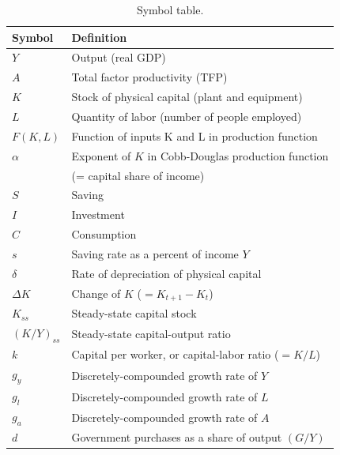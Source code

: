 \begin{table}[H]
\centering
\caption{Symbol table.}
\begin{tabular*}{0.95\textwidth}{l@{\extracolsep{\fill}}l}
\toprule
Symbol & Definition\\
\midrule
$Y$                            &Output (real GDP)\\
$A$                            &Total factor productivity (TFP)\\
$K$                            &Stock of physical capital (plant and equipment)\\
$L$                            &Quantity of labor (number of people employed)\\
$F(K,L)$                    &Function of inputs K and L in production function\\
$\alpha$                     &Exponent of $K$ in Cobb-Douglas production function \\
                            &(= capital share of income)\\
$S$                            &Saving\\
$I$                            &Investment\\
$C$                            &Consumption\\
$s$                         &    Saving rate as a percent of income $Y$\\
$\delta$                     &Rate of depreciation of physical capital\\
$\Delta K$                    &Change of $K$ ($=K_{t+1}-K_{t}$)\\
$K_{ss}$                    &Steady-state capital stock\\
$(K/Y)_{ss}$                &Steady-state capital-output ratio\\
$k$                         &Capital per worker, or capital-labor ratio ($=K/L$)\\
$g_y$                     &Discretely-compounded growth rate of $Y$\\
$g_l$                     &Discretely-compounded growth rate of $L$\\
$g_a$                     &Discretely-compounded growth rate of $A$\\
$d$                         &Government purchases as a share of output $(G/Y)$\\
\bottomrule
\end{tabular*}
\end{table}


